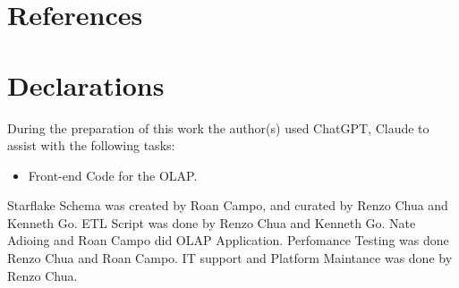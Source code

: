 \documentclass[sigconf, pbalance]{acmart}
\begin{document}











\section{References}






\section{Declarations}
During the preparation of this work the author(s) used ChatGPT, Claude to assist with the following tasks: 

\begin{itemize}
	\item Front-end Code for the OLAP.
\end{itemize}

Starflake Schema was created by Roan Campo, and curated by Renzo Chua and Kenneth Go.  ETL Script was done by Renzo Chua and Kenneth Go. Nate Adioing and Roan Campo did OLAP Application. Perfomance Testing was done Renzo Chua and Roan Campo. IT support and Platform Maintance was done by Renzo Chua.
\end{document}

